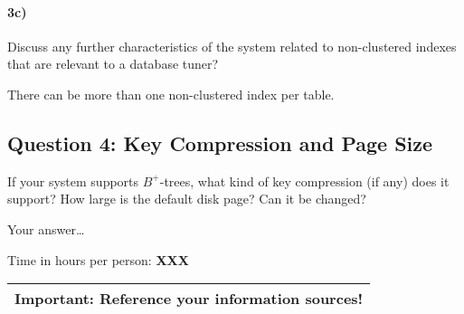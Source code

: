 \documentclass[11pt]{scrartcl}
\begin{document}
\paragraph{3c)} Discuss any further characteristics of the system related to
non-clustered indexes that are relevant to a database tuner?

There can be more than one non-clustered index per table.




\subsection*{Question 4: Key Compression and Page Size} If your system
supports $B^+$-trees, what kind of key compression (if any) does it
support?  How large is the default disk page? Can it be changed?


\smallskip

Your answer\dots


\bigskip

\noindent Time in hours per person: {\bf XXX}

\bigskip

\begin{center}
  \begin{tabular}{c}
    \hline
    {\bf Important:} Reference your information sources!
    \\\hline
  \end{tabular}
\end{center}
\end{document}
